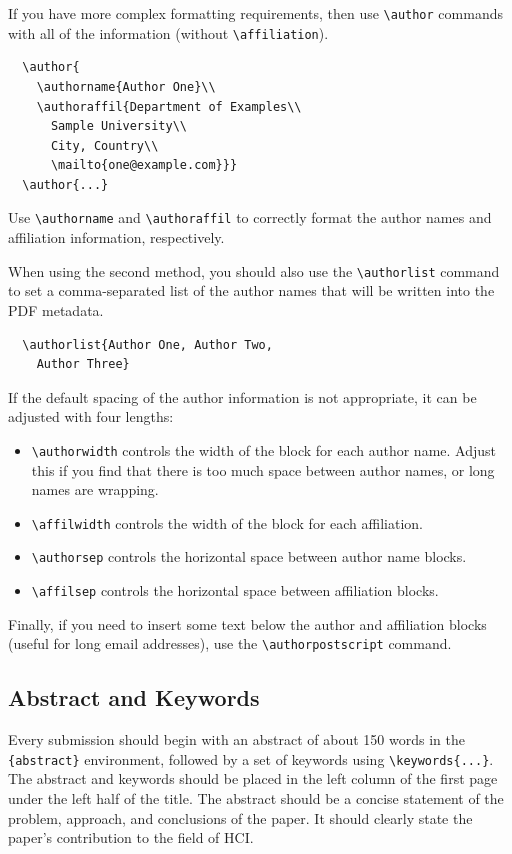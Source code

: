 \documentclass[preprint]{../latex/sigchi-modern}
\begin{document}
If you have more complex formatting requirements, then use
\texttt{\textbackslash author} commands with all of the information (without
\texttt{\textbackslash affiliation}).
\begin{verbatim}
  \author{
    \authorname{Author One}\\
    \authoraffil{Department of Examples\\
      Sample University\\
      City, Country\\
      \mailto{one@example.com}}}
  \author{...}
\end{verbatim}
Use \texttt{\textbackslash authorname} and \texttt{\textbackslash authoraffil}
to correctly format the author names and affiliation information, respectively.

When using the second method, you should also use the
\texttt{\textbackslash author\-list} command to set a comma-separated list of
the author names that will be written into the PDF metadata.
\begin{verbatim}
  \authorlist{Author One, Author Two, 
    Author Three}
\end{verbatim}

If the default spacing of the author information is not appropriate, it can be
adjusted with four lengths:
\begin{itemize}
  \item \texttt{\textbackslash authorwidth} controls the width of the block
    for each author name.
    Adjust this if you find that there is too much space between author names,
    or long names are wrapping.
  \item \texttt{\textbackslash affilwidth} controls the width of the block
    for each affiliation.
  \item \texttt{\textbackslash authorsep} controls the horizontal space
    between author name blocks.
  \item \texttt{\textbackslash affilsep} controls the horizontal space between
    affiliation blocks.
\end{itemize}

Finally, if you need to insert some text below the author and affiliation
blocks (useful for long email addresses), use the
\texttt{\textbackslash authorpostscript} command.

\subsection{Abstract and Keywords}
Every submission should begin with an abstract of about 150 words in the
\texttt{\{abstract\}} environment, followed by a set of keywords using
\texttt{\textbackslash keywords\{...\}}. The abstract and keywords should be
placed in the left column of the first page under the left half of the title.
The abstract should be a concise statement of the problem, approach, and
conclusions of the paper. It should clearly state the paper's contribution to
the field of HCI.
\end{document}
